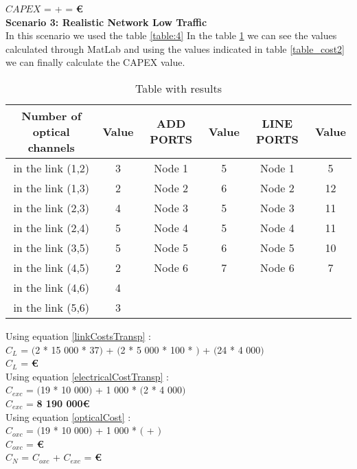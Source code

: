 $CAPEX$ =  +  = \textbf{ \euro}\\


\vspace{11pt}
\textbf{Scenario 3: Realistic Network Low Traffic} \label{Scenario3_transp} \\
In this scenario we used the table \ref{table:4} In the table \ref{result_ILP3_T} we can see the values calculated through MatLab and using the values indicated in table \ref{table_cost2} we can finally calculate the CAPEX value. \\

\begin{table}[h!]
\centering
\begin{tabular}{|| c | c || c | c || c | c ||}
 \hline
 Number of optical channels & Value & ADD PORTS & Value & LINE PORTS & Value \\
 \hline\hline
 in the link (1,2) & 3 & Node 1 & 5 & Node 1 & 5 \\
 in the link (1,3) & 2 & Node 2 & 6 & Node 2 & 12 \\
 in the link (2,3) & 4 & Node 3 & 5 & Node 3 & 11 \\
 in the link (2,4) & 5 & Node 4 & 5 & Node 4 & 11 \\
 in the link (3,5) & 5 & Node 5 & 6 & Node 5 & 10 \\
 in the link (4,5) & 2 & Node 6 & 7 & Node 6 & 7 \\
 in the link (4,6) & 4 & & & & \\
 in the link (5,6) & 3 & & & & \\
 \hline
\end{tabular}
\caption{Table with results}
\label{result_ILP3_T}
\end{table}

Using equation \ref{linkCostsTransp} : \\
$C_L$ = $($2 * 15 000 * 37$)$ + $($2 * 5 000 * 100 * $)$ + $($24 * 4 000$)$ \\
$C_L$ = \textbf{ \euro} \\

Using equation \ref{electricalCostTransp} : \\
$C_{exc}$ = $($19 * 10 000$)$ + 1 000 * $($2 * 4 000$)$ \\
$C_{exc}$ = \textbf{8 190 000\euro} \\

Using equation \ref{opticalCost} : \\
$C_{oxc}$ = $($19 * 10 000$)$ + 1 000 * $($ + $)$ \\
$C_{oxc}$ = \textbf{ \euro} \\
$C_N$ = $C_{oxc}$ + $C_{exc}$ = \textbf{ \euro} \\

